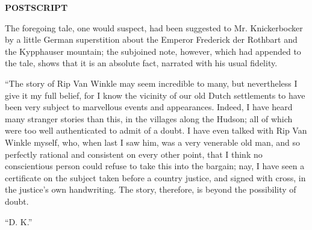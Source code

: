 \clearpage
\begin{center}
	\textbf{POSTSCRIPT\\}
\end{center}

\noindent
The foregoing tale, one would suspect, had been suggested to Mr. Knickerbocker by a little German superstition about the Emperor Frederick der Rothbart and the Kypphauser mountain; the subjoined note, however, which had appended to the tale, shows that it is an absolute fact, narrated with his usual fidelity.

“The story of Rip Van Winkle may seem incredible to many, but nevertheless I give it my full belief, for I know the vicinity of our old Dutch settlements to have been very subject to marvellous events and appearances. Indeed, I have heard many stranger stories than this, in the villages along the Hudson; all of which were too well authenticated to admit of a doubt. I have even talked with Rip Van Winkle myself, who, when last I saw him, was a very venerable old man, and so perfectly rational and consistent on every other point, that I think no conscientious person could refuse to take this into the bargain; nay, I have seen a certificate on the subject taken before a country justice, and signed with cross, in the justice’s own handwriting. The story, therefore, is beyond the possibility of doubt.

\begin{flushright}
	“D. K.”
\end{flushright}


